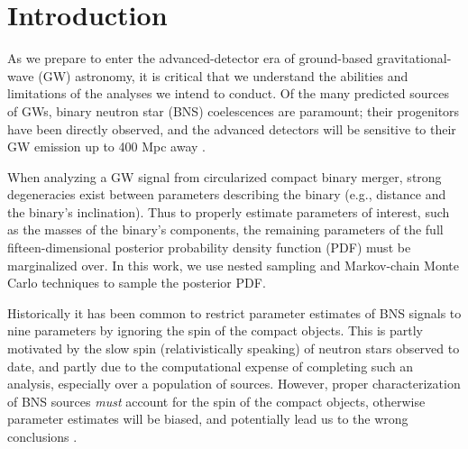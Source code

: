 \section{Introduction}

As we prepare to enter the advanced-detector era of ground-based gravitational-wave (GW) astronomy, it is critical that we understand the abilities and limitations of the analyses we intend to conduct.  Of the many predicted sources of GWs, binary neutron star (BNS) coelescences are paramount; their progenitors have been directly observed, and the advanced detectors will be sensitive to their GW emission up to 400 Mpc away \citep{2013arXiv1304.0670L}.

When analyzing a GW signal from circularized compact binary merger, strong degeneracies exist between parameters describing the binary (e.g., distance and the binary's inclination).  Thus to properly estimate parameters of interest, such as the masses of the binary's components, the remaining parameters of the full fifteen-dimensional posterior probability density function (PDF) must be marginalized over.  In this work, we use nested sampling \citep{Veitch_2010} and Markov-chain Monte Carlo \citep{Christensen_2003,R_ver_2006,van_der_Sluys_2008} techniques to sample the posterior PDF.

Historically it has been common to restrict parameter estimates of BNS signals to nine parameters by ignoring the spin of the compact objects.  This is partly motivated by the slow spin (relativistically speaking) of neutron stars observed to date, and partly due to the computational expense of completing such an analysis, especially over a population of sources.  However, proper characterization of BNS sources \emph{must} account for the spin of the compact objects, otherwise parameter estimates will be biased, and potentially lead us to the wrong conclusions \citep{Buonanno_2009}.

